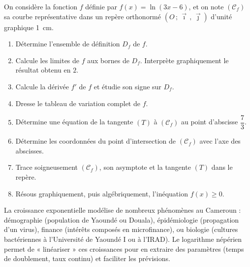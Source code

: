 \documentclass[11pt]{article}
\begin{document}
\begin{exercice}
On considère la fonction $f$ définie par $f(x) = \ln(3x - 6)$, et on note $(\mathcal{C}_f)$ sa courbe représentative dans un repère orthonormé $(O\,;\,\vec{\imath}\,,\,\vec{\jmath})$ d'unité graphique \SI{1}{cm}.
\begin{enumerate}
\item Détermine l'ensemble de définition $D_f$ de $f$.
\item Calcule les limites de $f$ aux bornes de $D_f$. Interprète graphiquement le résultat obtenu en $2$.
\item Calcule la dérivée $f'$ de $f$ et étudie son signe sur $D_f$.
\item Dresse le tableau de variation complet de $f$.
\item Détermine une équation de la tangente $(T)$ à $(\mathcal{C}_f)$ au point d'abscisse $\dfrac{7}{3}$.
\item Détermine les coordonnées du point d'intersection de $(\mathcal{C}_f)$ avec l'axe des abscisses.
\item Trace soigneusement $(\mathcal{C}_f)$, son asymptote et la tangente $(T)$ dans le repère.
\item Résous graphiquement, puis algébriquement, l'inéquation $f(x) \geq 0$.
\end{enumerate}
\end{exercice}

\begin{savaistu}
La croissance exponentielle modélise de nombreux phénomènes au Cameroun : démographie (population de Yaoundé ou Douala), épidémiologie (propagation d'un virus), finance (intérêts composés en microfinance), ou biologie (cultures bactériennes à l'Université de Yaoundé I ou à l'IRAD). Le logarithme népérien permet de « linéariser » ces croissances pour en extraire des paramètres (temps de doublement, taux continu) et faciliter les prévisions.
\end{savaistu}
\end{document}
